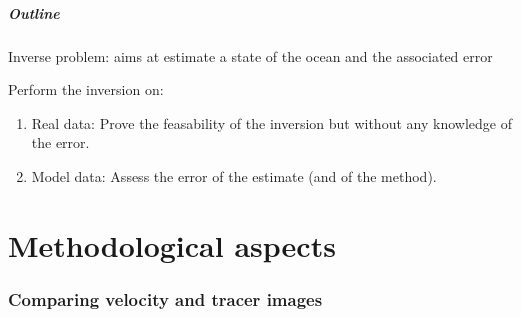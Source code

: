 \documentclass[compress,slidescentered,notes=show]{beamer}
\begin{document}
\begin{frame}
  \frametitle{Outline}

  \begin{block}{}
    Inverse problem: aims at estimate a state of the ocean and the associated error
  \end{block}

  \begin{block}{Perform the inversion on:}
  \begin{enumerate}
    \item Real data: Prove the feasability of the inversion but without any knowledge of the error.%
    \item Model data: Assess the error of the estimate (and of the method).
  \end{enumerate}
  \end{block}
\end{frame}

\part{Methodological aspects}

\begin{frame}
  \frametitle{\insertromanpartnumber \hspace{1em} \insertpart}
  \tableofcontents[hideotherpart]
\end{frame}
%
\section{Comparing velocity and tracer images}
\end{document}
